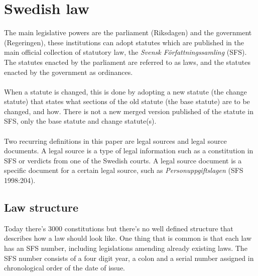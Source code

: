 \section{Swedish law}
The main legislative powers are the parliament (Riksdagen) and the government (Regeringen), these institutions can adopt statutes which are published in the main official collection of statutory law, the \textit{Svensk Författningssamling} (SFS). The statutes enacted by the parliament are referred to as laws, and the statutes enacted by the government as ordinances.\\\\
When a statute is changed, this is done by adopting a new statute (the change statute) that states what sections of the old statute (the base statute) are to be changed, and how. There is not a new merged version published of the statute in SFS, only the base statute and change statute(s).\\\\
Two recurring definitions in this paper are legal sources and legal source documents. A legal source is a type of legal information such as a constitution in SFS or verdicts from one of the Swedish courts. A legal source document is a specific document for a certain legal source, such as \textit{Personuppgiftslagen} (SFS 1998:204). 
\subsection{Law structure}
Today there's 3000 constitutions but there's no well defined structure that describes how a law should look like. One thing that is common is that each law has an SFS number, including legislations amending already existing laws. The SFS number consists of a four digit year, a colon and a serial number assigned in chronological order of the date of issue. 


